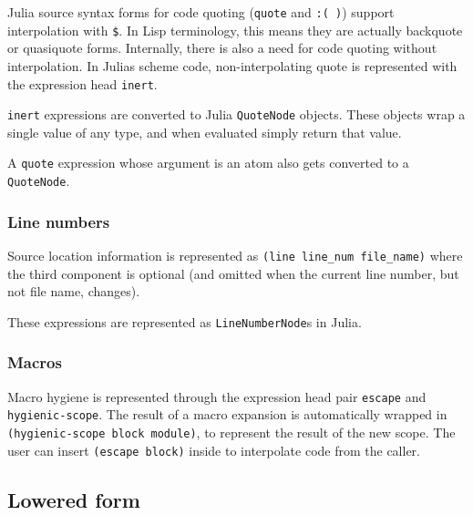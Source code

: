 Julia source syntax forms for code quoting (\texttt{quote} and \texttt{:( )}) support interpolation with \texttt{\$}. In Lisp terminology, this means they are actually {\textquotedbl}backquote{\textquotedbl} or {\textquotedbl}quasiquote{\textquotedbl} forms. Internally, there is also a need for code quoting without interpolation. In Julia{\textquotesingle}s scheme code, non-interpolating quote is represented with the expression head \texttt{inert}.



\texttt{inert} expressions are converted to Julia \texttt{QuoteNode} objects. These objects wrap a single value of any type, and when evaluated simply return that value.



A \texttt{quote} expression whose argument is an atom also gets converted to a \texttt{QuoteNode}.



\hypertarget{9438599814670899276}{}


\subsubsection{Line numbers}



Source location information is represented as \texttt{(line line\_num file\_name)} where the third component is optional (and omitted when the current line number, but not file name, changes).



These expressions are represented as \texttt{LineNumberNode}s in Julia.



\hypertarget{8143615541033323666}{}


\subsubsection{Macros}



Macro hygiene is represented through the expression head pair \texttt{escape} and \texttt{hygienic-scope}. The result of a macro expansion is automatically wrapped in \texttt{(hygienic-scope block module)}, to represent the result of the new scope. The user can insert \texttt{(escape block)} inside to interpolate code from the caller.



\hypertarget{16818744617880081407}{}


\subsection{Lowered form}



